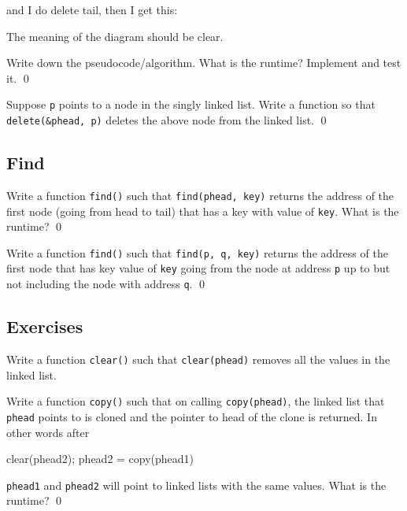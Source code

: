 and I do delete tail, then I get this:



The meaning of the diagram should be clear.

\begin{ex}
Write down the pseudocode/algorithm.
What is the runtime?
Implement and test it.
\qed
\end{ex}

\begin{ex}
Suppose \texttt{p} points to a node in the singly linked list.
Write a function so that \texttt{delete(\&phead, p)}
deletes the above node from the linked list.
\qed
\end{ex}

\newpage
\subsection{Find}

\begin{ex}
Write a function \verb!find()! such that
\verb!find(phead, key)! returns
the address of the first node (going from
head to tail) that has a key with value of \verb!key!.
What is the runtime?
\qed
\end{ex}

\begin{ex}
Write a function \verb!find()! such that
\verb!find(p, q, key)! returns the address of the first node
that has key value of \verb!key! going from the node at
address \verb!p! up to but not including the node with address
\verb!q!.
\qed
\end{ex}


\newpage
\subsection{Exercises}

\begin{ex}
Write a function \verb!clear()! such that
\verb!clear(phead)! removes all the values in the linked list. 
\end{ex}

\begin{ex}
Write a function \verb!copy()! such that
on calling \verb!copy(phead)!, the linked list that \verb!phead!
points to is cloned and the pointer to head of the clone is
returned.
In other words after
\begin{console}[fontsize=\footnotesize]
clear(phead2);
phead2 = copy(phead1)
\end{console}
\verb!phead1! and \verb!phead2! will point to linked lists
with the same values.
What is the runtime?
\qed
\end{ex}


